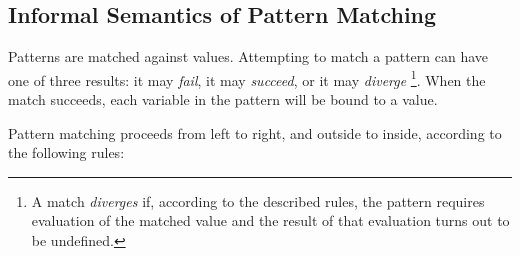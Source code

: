 \subsection{Informal Semantics of Pattern Matching} 

Patterns are matched against values. Attempting to match a pattern can have one of three results: it may \emph{fail}, it may \emph{succeed}, or it may \emph{diverge}
\footnote{A match \emph{diverges} if, according to the described rules, the pattern requires evaluation of the matched value and the result of that evaluation turns out to be undefined.}.
When the match succeeds, each variable in the pattern will be bound to a value.

Pattern matching proceeds from left to right, and outside to inside, according to the following rules:

